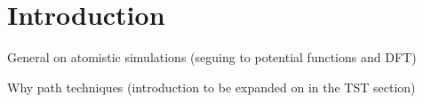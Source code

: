 \section{Introduction}
\label{sec:methods-introduction}

\bit
\item General on atomistic simulations (seguing to potential functions and DFT)
\item Why path techniques (introduction to be expanded on in the TST section)
\eit

\placeholder
